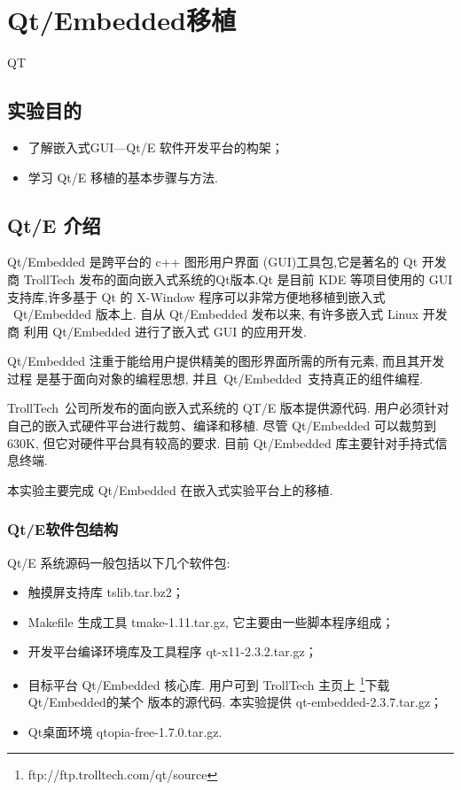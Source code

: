 \chapter{Qt/Embedded移植}{QT}

\section{实验目的}
\begin{itemize}\itemsep=-3pt
  \item 了解嵌入式GUI---Qt/E 软件开发平台的构架；
  \item 学习 Qt/E 移植的基本步骤与方法.
\end{itemize}

\section{Qt/E 介绍}
	Qt/Embedded 是跨平台的 c++ 图形用户界面 (GUI)工具包,它是著名的 Qt 开发商
TrollTech 发布的面向嵌入式系统的Qt版本.Qt 是目前 KDE 等项目使用的 GUI
支持库,许多基于 Qt 的 X-Window 程序可以非常方便地移植到嵌入式
~Qt/Embedded 版本上. 自从 Qt/Embedded 发布以来, 有许多嵌入式 Linux 开发商
利用 Qt/Embedded 进行了嵌入式 GUI 的应用开发.

	Qt/Embedded 注重于能给用户提供精美的图形界面所需的所有元素, 而且其开发过程
是基于面向对象的编程思想, 并且~Qt/Embedded~支持真正的组件编程.

	TrollTech~公司所发布的面向嵌入式系统的 QT/E 版本提供源代码. 用户必须针对
自己的嵌入式硬件平台进行裁剪、编译和移植. 尽管 Qt/Embedded 可以裁剪到630K,
但它对硬件平台具有较高的要求. 目前 Qt/Embedded 库主要针对手持式信息终端.

	本实验主要完成 Qt/Embedded 在嵌入式实验平台上的移植.
\subsection{Qt/E软件包结构}
	Qt/E 系统源码一般包括以下几个软件包:
\begin{itemize}\itemsep=-3pt
  \item 触摸屏支持库 tslib.tar.bz2；
  \item Makefile 生成工具 tmake-1.11.tar.gz, 它主要由一些脚本程序组成；
  \item 开发平台编译环境库及工具程序 qt-x11-2.3.2.tar.gz；
  \item 目标平台 Qt/Embedded 核心库. 用户可到 TrollTech 主页上
		\footnote{ftp://ftp.trolltech.com/qt/source}下载Qt/Embedded的某个
		版本的源代码. 本实验提供 qt-embedded-2.3.7.tar.gz；
  \item Qt桌面环境 qtopia-free-1.7.0.tar.gz.
\end{itemize}

